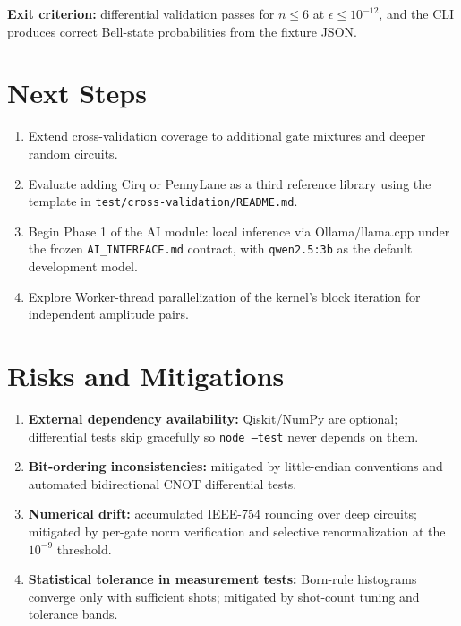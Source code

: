\documentclass[conference]{IEEEtran}
\begin{document}
\noindent
\textbf{Exit criterion:} differential validation passes for $n\le6$ at $\epsilon\le10^{-12}$, and the CLI produces correct Bell-state probabilities from the fixture JSON.

\section{Next Steps}
\begin{enumerate}
    \item Extend cross-validation coverage to additional gate mixtures and deeper random circuits.
    \item Evaluate adding Cirq or PennyLane as a third reference library using the template in \texttt{test/cross-validation/README.md}.
    \item Begin Phase 1 of the AI module: local inference via Ollama/llama.cpp under the frozen \texttt{AI\_INTERFACE.md} contract, with \texttt{qwen2.5:3b} as the default development model.
    \item Explore Worker-thread parallelization of the kernel's block iteration for independent amplitude pairs.
\end{enumerate}

\section{Risks and Mitigations}
\begin{enumerate}
    \item \textbf{External dependency availability:} Qiskit/NumPy are optional; differential tests skip gracefully so \texttt{node --test} never depends on them.
    \item \textbf{Bit-ordering inconsistencies:} mitigated by little-endian conventions and automated bidirectional CNOT differential tests.
    \item \textbf{Numerical drift:} accumulated IEEE-754 rounding over deep circuits; mitigated by per-gate norm verification and selective renormalization at the $10^{-9}$ threshold.
    \item \textbf{Statistical tolerance in measurement tests:} Born-rule histograms converge only with sufficient shots; mitigated by shot-count tuning and tolerance bands.
\end{enumerate}
\end{document}
